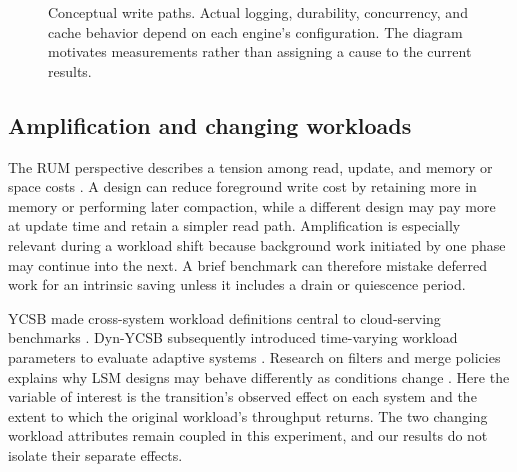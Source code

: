\documentclass[10pt]{article}
\begin{document}
\begin{figure}[htbp]
\centering
{}
\caption{Conceptual write paths. Actual logging, durability, concurrency, and cache behavior depend on each engine's configuration. The diagram motivates measurements rather than assigning a cause to the current results.}
\label{fig:paths}
\end{figure}

\subsection{Amplification and changing workloads}
The RUM perspective describes a tension among read, update, and memory or space costs \cite{athanassoulis2016}. A design can reduce foreground write cost by retaining more in memory or performing later compaction, while a different design may pay more at update time and retain a simpler read path. Amplification is especially relevant during a workload shift because background work initiated by one phase may continue into the next. A brief benchmark can therefore mistake deferred work for an intrinsic saving unless it includes a drain or quiescence period.

YCSB made cross-system workload definitions central to cloud-serving benchmarks \cite{cooper2010}. Dyn-YCSB subsequently introduced time-varying workload parameters to evaluate adaptive systems \cite{sidhanta2019}. Research on filters and merge policies explains why LSM designs may behave differently as conditions change \cite{dayan2017,dayan2018}. Here the variable of interest is the transition's observed effect on each system and the extent to which the original workload's throughput returns. The two changing workload attributes remain coupled in this experiment, and our results do not isolate their separate effects.
\end{document}
